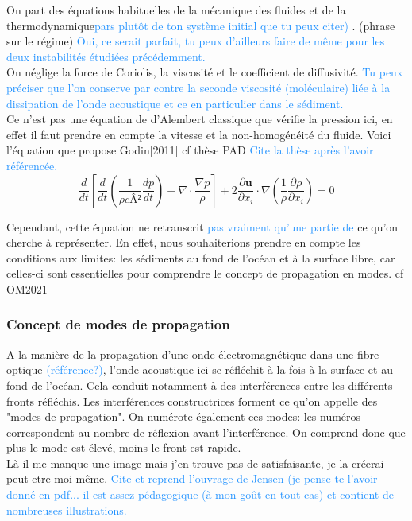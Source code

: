 \documentclass{rapportECC}
\newcommand{\FAadd}[1]{\textcolor{DodgerBlue}{{#1}}}                     %
\newcommand{\FAdel}[1]{\textcolor{DodgerBlue}{\sout{#1}}}                %
\begin{document}
On part des équations habituelles de la mécanique des fluides et de la thermodynamique\FAadd{pars plutôt de ton système initial que tu peux citer)} . (phrase sur le régime) \FAadd{Oui, ce serait parfait, tu peux d'ailleurs faire de même pour les deux instabilités étudiées précédemment.}
\\
On néglige la force de Coriolis, la viscosité et le coefficient de diffusivité. \FAadd{Tu peux préciser que l'on conserve par contre la seconde viscosité (moléculaire) liée à la dissipation de l'onde acoustique et ce en particulier dans le sédiment.}
\\
Ce n'est pas une équation de d'Alembert classique que vérifie la pression ici, en effet il faut prendre en compte la vitesse et la non-homogénéité du fluide. Voici l'équation que propose Godin[2011] cf thèse PAD \FAadd{Cite la thèse après l'avoir référencée.}
\begin{equation}
    \frac{d}{dt}[\frac{d}{dt}(\frac{1}{\rho cÂ²}\frac{dp}{dt}) - \nabla \cdot \frac{\nabla p}{\rho}] + 2\frac{\partial \mathbf{u}}{\partial x_i} \cdot \nabla (\frac{1}{\rho}\frac{\partial \rho}{\partial x_i}) = 0
\end{equation}

Cependant, cette équation ne retranscrit \FAdel{pas vraiment} \FAadd{ qu'une partie de} ce qu'on cherche à représenter. En effet, nous souhaiterions prendre en compte les conditions aux limites: les sédiments au fond de l'océan et à la surface libre, car celles-ci sont essentielles pour comprendre le concept de propagation en modes. cf OM2021

\subsubsection{Concept de modes de propagation}

A la manière de la propagation d'une onde électromagnétique dans une fibre optique \FAadd{(référence?)}, l'onde acoustique ici se réfléchit à la fois à la surface et au fond de l'océan. Cela conduit notamment à des interférences entre les différents fronts réfléchis. Les interférences constructrices forment ce qu'on appelle des "modes de propagation". On numérote également ces modes: les numéros correspondent au nombre de réflexion avant l'interférence. On comprend donc que plus le mode est élevé, moins le front est rapide. \\
Là il me manque une image mais j'en trouve pas de satisfaisante, je la créerai peut etre moi même. \FAadd{ Cite et reprend l'ouvrage de Jensen (je pense te l'avoir donné en pdf... il est assez pédagogique (à mon goût en tout cas) et contient de nombreuses illustrations.}
\\
\end{document}
